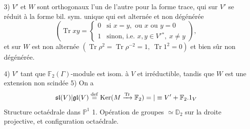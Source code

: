 3) $V'$ et $W$ sont orthogonaux l'un de l'autre pour la forme trace, qui sur $V'$ se réduit à la forme bil. sym. unique qui est alternée et non dégénérée
\[
(\operatorname{Tr}xy=\begin{cases}
0&\text{si }x=y,\text{ ou }x\text{ ou }y=0\\
1&\text{sinon, i.e. }x,y\in V'{}^*,\ x\ne y
\end{cases}),
\]
et sur $W$ est non alternée $(\operatorname{Tr}\rho^2=\operatorname{Tr}\rho^{-2}=1,\ \operatorname{Tr}1^2=0)$ et bien sûr non dégénérée.

4) $V'$  tant que $\mathbb F_2(\Gamma)$-module est isom. à $V$ et irréductible, tandis que $W$ est une extension non scindée
\hfill{}
5) On a
\[
\mathfrak{sl}(V)|\mathfrak{gl}(V)\overset{\mathrm{def}}{=}
\operatorname{Ker}(M\xrightarrow{\operatorname{Tr}}\mathbb F_2)
=|\equiv V'+\mathbb F_2.1_V
\]
Structure octaédrale dans $\mathbb P^1$
1. Opération de groupes $\simeq\mathbb D_2$ sur la droite projective, et configuration octaédrale.

